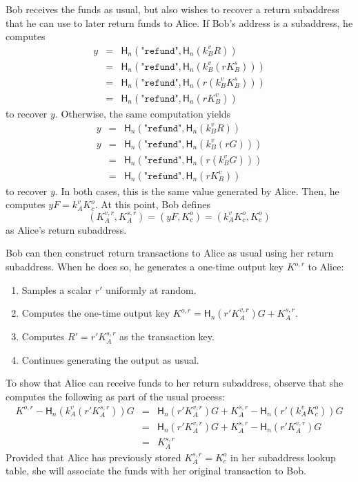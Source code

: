 \documentclass{article}
\newcommand{\hash}{\mathsf{H}_n}
\begin{document}
Bob receives the funds as usual, but also wishes to recover a return subaddress that he can use to later return funds to Alice.
If Bob's address is a subaddress, he computes
\begin{eqnarray*}
	y &=& \hash\left( \texttt{"refund"}, \hash(k_B^v R) \right) \\
	&=& \hash\left( \texttt{"refund"}, \hash(k_B^v (r K_B^s)) \right) \\
	&=& \hash\left( \texttt{"refund"}, \hash(r (k_B^v K_B^s)) \right) \\
	&=& \hash\left( \texttt{"refund"}, \hash(r K_B^v) \right)
\end{eqnarray*}
to recover $y$.
Otherwise, the same computation yields
\begin{eqnarray*}
	y &=& \hash\left( \texttt{"refund"}, \hash(k_B^v R) \right) \\
	y &=& \hash\left( \texttt{"refund"}, \hash(k_B^v (r G)) \right) \\
	&=& \hash\left( \texttt{"refund"}, \hash(r (k_B^v G)) \right) \\
	&=& \hash\left( \texttt{"refund"}, \hash(r K_B^v) \right)
\end{eqnarray*}
to recover $y$.
In both cases, this is the same value generated by Alice.
Then, he computes $y F = k_A^v K_c^o$.
At this point, Bob defines
$$(K_A^{v,r}, K_A^{s,r}) = (y F, K_c^o) = (k_A^v K_c^o, K_c^o)$$
as Alice's return subaddress.

Bob can then construct return transactions to Alice as usual using her return subaddress.
When he does so, he generates a one-time output key $K^{o,r}$ to Alice:
\begin{enumerate}
	\item Samples a scalar $r'$ uniformly at random.
	\item Computes the one-time output key $K^{o,r} = \hash(r' K_A^{v,r}) G + K_A^{s,r}$.
	\item Computes $R' = r' K_A^{s,r}$ as the transaction key.
	\item Continues generating the output as usual.
\end{enumerate}

To show that Alice can receive funds to her return subaddress, observe that she computes the following as part of the usual process:
\begin{eqnarray*}
	K^{o,r} - \hash\left( k_A^v (r' K_A^{s,r}) \right) G &=& \hash(r' K_A^{v,r}) G + K_A^{s,r} - \hash\left( r' (k_A^v K_c^o) \right) G \\
	&=& \hash(r' K_A^{v,r}) G + K_A^{s,r} - \hash(r' K_A^{v,r}) G \\
	&=& K_A^{s,r}
\end{eqnarray*}
Provided that Alice has previously stored $K_A^{s,r} = K_c^o$ in her subaddress lookup table, she will associate the funds with her original transaction to Bob.
\end{document}
